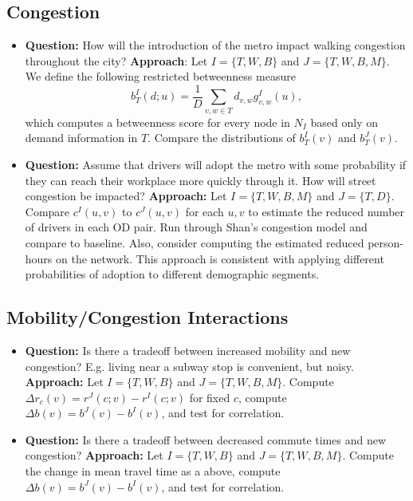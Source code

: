 \documentclass[english]{scrartcl}
\begin{document}
	\subsection{Congestion}
		\begin{itemize}
			\item \textbf{Question:} How will the introduction of the metro impact walking congestion throughout the city? \textbf{Approach}: Let $I = \{ T, W, B \}$ and $J = \{T, W, B, M \}$. We define the following restricted betweenness measure
			\begin{equation*}
				b^{I}_T(d;u) = \frac{1}{D} \sum_{v,w \in T} d_{v,w}g^{I}_{v,w}(u),
			\end{equation*} 
			which computes a betweenness score for every node in $N_I$ based only on demand information in $T$. 
			Compare the distributions of $b_T^{I}(v)$ and $b_T^{J}(v)$.
			\item \textbf{Question:} Assume that drivers will adopt the metro with some probability if they can reach their workplace more quickly through it. How will street congestion be impacted? \textbf{Approach:} Let $I = \{T, W, B, M \}$ and $J = \{ T, D \}$. Compare $c^{I}(u,v)$ to $c^{J}(u,v)$ for each $u,v$ to estimate the reduced number of drivers in each OD pair. Run through Shan's congestion model and compare to baseline. Also, consider computing the estimated reduced person-hours on the network. This approach is consistent with applying different probabilities of adoption to different demographic segments. 
		\end{itemize}

	\subsection{Mobility/Congestion Interactions}
		\begin{itemize}
			\item \textbf{Question:} Is there a tradeoff between increased mobility and new congestion? E.g. living near a subway stop is convenient, but noisy. \textbf{Approach:} Let $I = \{ T, W, B \}$ and $J = \{T, W, B, M \}$. Compute $\Delta r_c(v) = r^{J}(c;v) - r^{I}(c;v)$ for fixed $c$, compute $\Delta b(v) = b^{J}(v) - b^{I}(v)$, and test for correlation.
			\item \textbf{Question:} Is there a tradeoff between decreased commute times and new congestion?  \textbf{Approach:} Let $I = \{ T, W, B \}$ and $J = \{T, W, B, M \}$. Compute the change in mean travel time as a above, compute $\Delta b(v) = b^{J}(v) - b^{I}(v)$, and test for correlation.
		\end{itemize}
\end{document}
